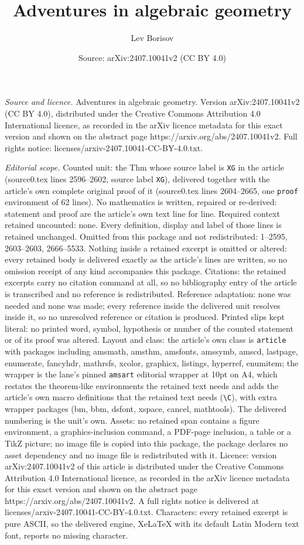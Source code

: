 \documentclass[10pt,a4paper]{amsart}
\title[Adventures in algebraic geometry]{Adventures in algebraic geometry}
\author{Lev Borisov}
\date{Source: arXiv:2407.10041v2 (CC BY 4.0)}
\begin{document}
\maketitle

\noindent\emph{Source and licence.} Adventures in algebraic geometry. Version arXiv:2407.10041v2 (CC BY 4.0), distributed under the Creative Commons Attribution 4.0 International licence, as recorded in the arXiv licence metadata for this exact version and shown on the abstract page https://arxiv.org/abs/2407.10041v2. Full rights notice: licenses/arxiv-2407.10041-CC-BY-4.0.txt.\par\smallskip

\noindent\textit{Editorial scope.} Counted unit: the Thm whose source label is \texttt{XG} in the article (source0.tex lines 2596--2602, source label \texttt{XG}), delivered together with the article's own complete original proof of it (source0.tex lines 2604--2665, one \texttt{proof} environment of 62 lines). No mathematics is written, repaired or re-derived: statement and proof are the article's own text line for line. Required context retained uncounted: none. Every definition, display and label of those lines is retained unchanged. Omitted from this package and not redistributed: 1--2595, 2603--2603, 2666--5533. Nothing inside a retained excerpt is omitted or altered: every retained body is delivered exactly as the article's lines are written, so no omission receipt of any kind accompanies this package. Citations: the retained excerpts carry no citation command at all, so no bibliography entry of the article is transcribed and no reference is redistributed. Reference adaptation: none was needed and none was made; every reference inside the delivered unit resolves inside it, so no unresolved reference or citation is produced. Printed slips kept literal: no printed word, symbol, hypothesis or number of the counted statement or of its proof was altered. Layout and class: the article's own class is \texttt{article} with packages including amsmath, amsthm, amsfonts, amssymb, amscd, lastpage, enumerate, fancyhdr, mathrsfs, xcolor, graphicx, listings, hyperref, enumitem; the wrapper is the lane's pinned \texttt{amsart} editorial wrapper at 10pt on A4, which restates the theorem-like environments the retained text needs and adds the article's own macro definitions that the retained text needs (\texttt{\textbackslash C}), with extra wrapper packages (bm, bbm, dsfont, xspace, cancel, mathtools). The delivered numbering is the unit's own. Assets: no retained span contains a figure environment, a graphics-inclusion command, a PDF-page inclusion, a table or a TikZ picture; no image file is copied into this package, the package declares no asset dependency and no image file is redistributed with it. Licence: version arXiv:2407.10041v2 of this article is distributed under the Creative Commons Attribution 4.0 International licence, as recorded in the arXiv licence metadata for this exact version and shown on the abstract page https://arxiv.org/abs/2407.10041v2. A full rights notice is delivered at licenses/arxiv-2407.10041-CC-BY-4.0.txt. Characters: every retained excerpt is pure ASCII, so the delivered engine, XeLaTeX with its default Latin Modern text font, reports no missing character.
\end{document}
